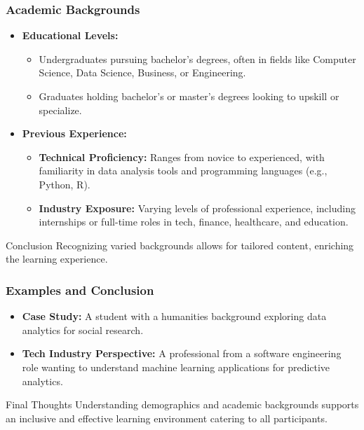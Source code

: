 \documentclass[aspectratio=169]{beamer}
\begin{document}
\begin{frame}[fragile]
    \frametitle{Academic Backgrounds}
    \begin{itemize}
        \item \textbf{Educational Levels:} 
            \begin{itemize}
                \item Undergraduates pursuing bachelor's degrees, often in fields like Computer Science, Data Science, Business, or Engineering.
                \item Graduates holding bachelor's or master's degrees looking to upskill or specialize.
            \end{itemize}
        
        \item \textbf{Previous Experience:} 
            \begin{itemize}
                \item \textbf{Technical Proficiency:} Ranges from novice to experienced, with familiarity in data analysis tools and programming languages (e.g., Python, R).
                \item \textbf{Industry Exposure:} Varying levels of professional experience, including internships or full-time roles in tech, finance, healthcare, and education.
            \end{itemize}
    \end{itemize}
    \begin{block}{Conclusion}
        Recognizing varied backgrounds allows for tailored content, enriching the learning experience.
    \end{block}
\end{frame}

\begin{frame}[fragile]
    \frametitle{Examples and Conclusion}
    \begin{itemize}
        \item \textbf{Case Study:} A student with a humanities background exploring data analytics for social research.
        \item \textbf{Tech Industry Perspective:} A professional from a software engineering role wanting to understand machine learning applications for predictive analytics.
    \end{itemize}
    \begin{block}{Final Thoughts}
        Understanding demographics and academic backgrounds supports an inclusive and effective learning environment catering to all participants.
    \end{block}
\end{frame}
\end{document}
